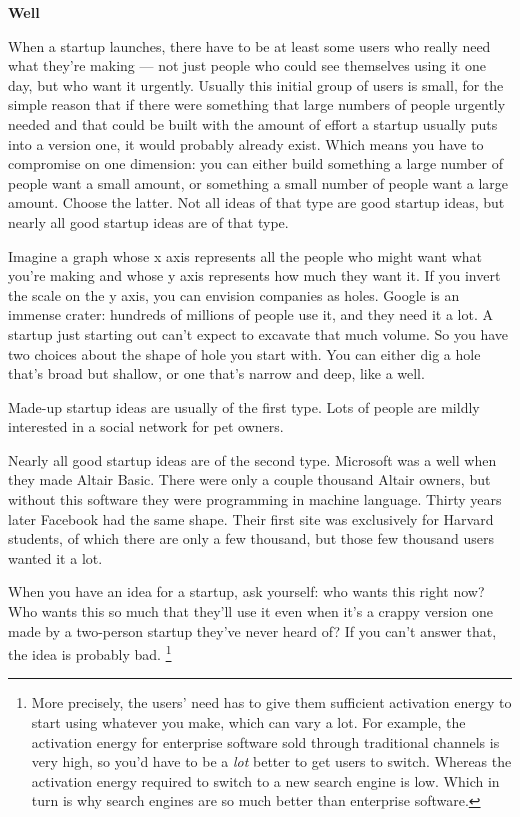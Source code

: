 \documentclass[12pt]{book}
\begin{document}
\textbf{Well}

When a startup launches, there have to be at least some users who really
need what they're making --- not just people who could see themselves
using it one day, but who want it urgently. Usually this initial group
of users is small, for the simple reason that if there were something
that large numbers of people urgently needed and that could be built
with the amount of effort a startup usually puts into a version one, it
would probably already exist. Which means you have to compromise on one
dimension: you can either build something a large number of people want
a small amount, or something a small number of people want a large
amount. Choose the latter. Not all ideas of that type are good startup
ideas, but nearly all good startup ideas are of that type.

Imagine a graph whose x axis represents all the people who might want
what you're making and whose y axis represents how much they want it. If
you invert the scale on the y axis, you can envision companies as holes.
Google is an immense crater: hundreds of millions of people use it, and
they need it a lot. A startup just starting out can't expect to excavate
that much volume. So you have two choices about the shape of hole you
start with. You can either dig a hole that's broad but shallow, or one
that's narrow and deep, like a well.

Made-up startup ideas are usually of the first type. Lots of people are
mildly interested in a social network for pet owners.

Nearly all good startup ideas are of the second type. Microsoft was a
well when they made Altair Basic. There were only a couple thousand
Altair owners, but without this software they were programming in
machine language. Thirty years later Facebook had the same shape. Their
first site was exclusively for Harvard students, of which there are only
a few thousand, but those few thousand users wanted it a lot.

When you have an idea for a startup, ask yourself: who wants this right
now? Who wants this so much that they'll use it even when it's a crappy
version one made by a two-person startup they've never heard of? If you
can't answer that, the idea is probably bad. \footnote{More precisely, the users' need has to give them sufficient
activation energy to start using whatever you make, which can vary a
lot. For example, the activation energy for enterprise software sold
through traditional channels is very high, so you'd have to be a
\emph{lot} better to get users to switch. Whereas the activation energy
required to switch to a new search engine is low. Which in turn is why
search engines are so much better than enterprise software.}
\end{document}
